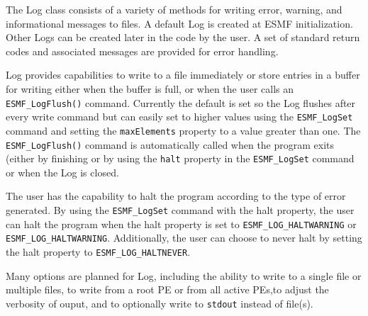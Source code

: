 



The Log class consists of a variety of methods for writing error, warning, and
informational messages to files.  A default Log is created at ESMF
initialization.  Other Logs can be created later in the code by the user.  A set
of standard return codes and associated messages are provided for error 
handling.  

Log provides capabilities to write to a file immediately or store entries in a 
buffer for writing either when the buffer is full, or when the user calls an 
{\tt ESMF\_LogFlush()} command.  Currently the default is set so the Log flushes
after every write command but can easily set to higher values using the 
{\tt ESMF\_LogSet} command and setting the {\tt maxElements} property to a value
greater than one.  The {\tt ESMF\_LogFlush()} command is automatically
called when the program exits (either by finishing or by using the {\tt halt}
property in the {\tt ESMF\_LogSet} command or when the Log is closed.

The user has the capability to halt the program according to the type of error
generated.  By using the {\tt ESMF\_LogSet} command with the halt property, the
user can halt the program when the halt property is set to 
{\tt ESMF\_LOG\_HALTWARNING} or {\tt ESMF\_LOG\_HALTWARNING}.  Additionally,
the user can choose to never halt by setting the halt property to
{\tt ESMF\_LOG\_HALTNEVER}.

Many options are planned for Log, including the ability to write to a single
file or multiple files, to write from a root PE or from all active PEs,to adjust
the verbosity of ouput, and to optionally write to {\tt stdout} instead of 
file(s).




